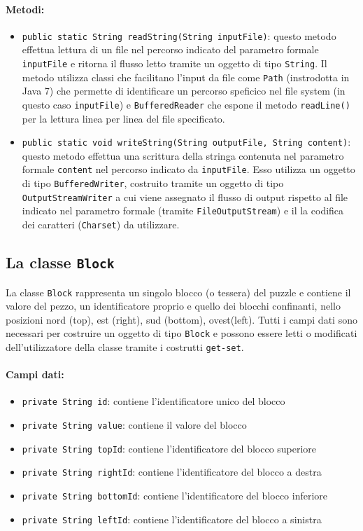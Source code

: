 \paragraph{Metodi:}
\begin{itemize}
\item \texttt{public static String readString(String inputFile)}: questo metodo effettua lettura di un file nel percorso indicato del parametro formale \texttt{inputFile} e ritorna il flusso letto tramite un oggetto di tipo \texttt{String}. Il metodo utilizza classi che facilitano l'input da file come \texttt{Path} (instrodotta in Java 7) che permette di identificare un percorso speficico nel file system (in questo caso \texttt{inputFile}) e \texttt{BufferedReader} che espone il metodo \texttt{readLine()} per la lettura linea per linea del file specificato. 

\item \texttt{public static void writeString(String outputFile, String content)}: questo metodo effettua una scrittura della stringa contenuta nel parametro formale \texttt{content} nel percorso indicato da \texttt{inputFile}. Esso utilizza un oggetto di tipo \texttt{BufferedWriter}, costruito tramite un oggetto di tipo \texttt{OutputStreamWriter} a cui viene assegnato il flusso di output rispetto al file indicato nel parametro formale (tramite \texttt{FileOutputStream}) e il la codifica dei caratteri (\texttt{Charset}) da utilizzare.
\end{itemize}

\subsection{La classe \texttt{Block}}
La classe \texttt{Block} rappresenta un singolo blocco (o tessera) del puzzle e contiene il valore del pezzo, un identificatore proprio e quello dei blocchi confinanti, nello posizioni nord (top), est (right), sud (bottom), ovest(left).
Tutti i campi dati sono necessari per costruire un oggetto di tipo \texttt{Block} e possono essere letti o modificati dell'utilizzatore della classe tramite i costrutti \texttt{get-set}.
\newpage

\paragraph{Campi dati:}
\begin{itemize}
\item \texttt{private String id}: contiene l'identificatore unico del blocco
\item \texttt{private String value}: contiene il valore del blocco
\item \texttt{private String topId}: contiene l'identificatore del blocco superiore
\item \texttt{private String rightId}: contiene l'identificatore del blocco a destra
\item \texttt{private String bottomId}: contiene l'identificatore del blocco inferiore
\item \texttt{private String leftId}: contiene l'identificatore del blocco a sinistra
\end{itemize} 


